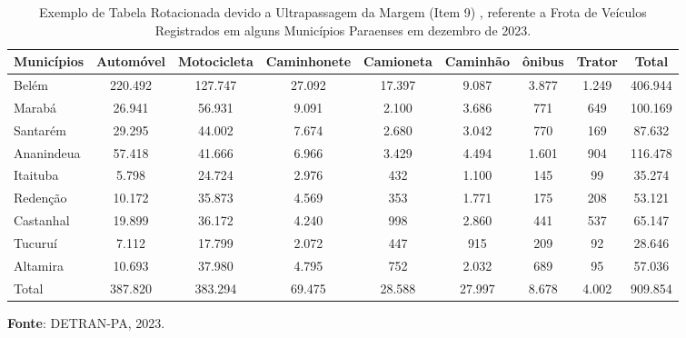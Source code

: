 \begin{table}
\begin{flushleft}
\caption{Exemplo de Tabela Rotacionada devido a Ultrapassagem da Margem (Item 9) , referente a Frota de Veículos Registrados em alguns Municípios Paraenses em dezembro de 2023.}
\end{flushleft}
\label{tabelarotacionada}
    \vspace{0.2cm}
\begin{tabular}{l|c|c|c|c|c|c|c|c}
\hline\hline
Municípios & Automóvel & Motocicleta & Caminhonete  & Camioneta & Caminhão  & ônibus & Trator & Total     \\
\hline\hline
Belém      & 220.492  & 127.747      & 27.092       & 17.397    & 9.087     & 3.877  & 1.249  & 406.944   \\
Marabá     & 26.941   & 56.931       & 9.091        & 2.100  & 3.686     & 771      & 649     & 100.169   \\
Santarém   & 29.295   & 44.002       & 7.674        & 2.680  & 3.042     & 770      & 169     & 87.632    \\ 
Ananindeua & 57.418   & 41.666       & 6.966        & 3.429  & 4.494     & 1.601    & 904     & 116.478   \\  
Itaituba   & 5.798    & 24.724       & 2.976        & 432    & 1.100     & 145      & 99      & 35.274    \\  
Redenção   & 10.172   & 35.873       & 4.569        & 353    & 1.771     & 175      & 208     & 53.121    \\
Castanhal  & 19.899   & 36.172       & 4.240        & 998    & 2.860     & 441      & 537     &  65.147    \\
Tucuruí    & 7.112    & 17.799       & 2.072        & 447    & 915       & 209      & 92      &  28.646    \\
Altamira   & 10.693   & 37.980       & 4.795        & 752    & 2.032     & 689      & 95      &  57.036   \\
\hline\hline
  Total    & 387.820  & 383.294      & 69.475      & 28.588  & 27.997    & 8.678    & 4.002   &  909.854  \\
\hline\hline 
\end{tabular}
\begin{flushleft}
\hspace{0.2cm}
\textbf{Fonte}: DETRAN-PA, 2023. 
\end{flushleft}
\end{table}





